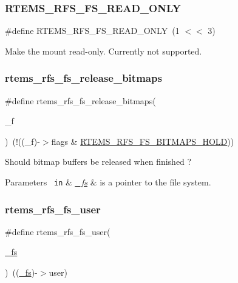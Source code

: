 \subsubsection{\texorpdfstring{RTEMS\_RFS\_FS\_READ\_ONLY}{RTEMS\_RFS\_FS\_READ\_ONLY}}
{\footnotesize\ttfamily \#define R\+T\+E\+M\+S\+\_\+\+R\+F\+S\+\_\+\+F\+S\+\_\+\+R\+E\+A\+D\+\_\+\+O\+N\+LY~(1 $<$$<$ 3)}

Make the mount read-\/only. Currently not supported. \mbox{\label{rtems-rfs-file-system_8h_a4f9e28f9a48032957ac008a48cd7e22a}} 
\subsubsection{\texorpdfstring{rtems\_rfs\_fs\_release\_bitmaps}{rtems\_rfs\_fs\_release\_bitmaps}}
{\footnotesize\ttfamily \#define rtems\+\_\+rfs\+\_\+fs\+\_\+release\+\_\+bitmaps(\begin{DoxyParamCaption}\item[{}]{\+\_\+f }\end{DoxyParamCaption})~(!((\+\_\+f)-\/$>$flags \& \mbox{\hyperlink{rtems-rfs-file-system_8h_a7b74db87d0962f9d81bbfd5d616664b8}{R\+T\+E\+M\+S\+\_\+\+R\+F\+S\+\_\+\+F\+S\+\_\+\+B\+I\+T\+M\+A\+P\+S\+\_\+\+H\+O\+LD}}))}

Should bitmap buffers be released when finished ?


\begin{DoxyParams}[1]{Parameters}
\mbox{\texttt{ in}}  & {\em \mbox{\hyperlink{struct__fs}{\+\_\+fs}}} & is a pointer to the file system. \\
\hline
\end{DoxyParams}
\mbox{\label{rtems-rfs-file-system_8h_ab76356f0ad0de1274bc4996618c00175}} 
\subsubsection{\texorpdfstring{rtems\_rfs\_fs\_user}{rtems\_rfs\_fs\_user}}
{\footnotesize\ttfamily \#define rtems\+\_\+rfs\+\_\+fs\+\_\+user(\begin{DoxyParamCaption}\item[{}]{\mbox{\hyperlink{struct__fs}{\+\_\+fs}} }\end{DoxyParamCaption})~((\mbox{\hyperlink{struct__fs}{\+\_\+fs}})-\/$>$user)}

